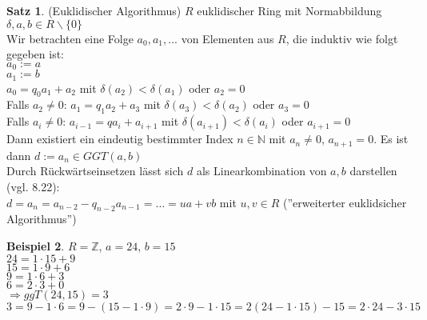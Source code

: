 \documentclass[10pt,a4paper,numbers=endperiod]{scrartcl}
\theoremstyle{definition}
\newtheorem{satz}{Satz}[section]
\newtheorem{bsp}[satz]{Beispiel}
\def\NN{{\mathbb N}}
\def\ZZ{{\mathbb Z}}
\begin{document}
\begin{satz}
	(Euklidischer Algorithmus) $R$ euklidischer Ring mit Normabbildung $\delta, a,b \in R \backslash \{0\}$\\
	Wir betrachten eine Folge $a_0, a_1,...$ von Elementen aus $R$, die induktiv wie folgt gegeben ist:\\
	$a_0 := a$\\
	$a_1 := b$\\
	$a_0 = q_0a_1 + a_2$ mit $\delta(a_2) < \delta(a_1)$ oder $a_2 = 0$\\
	
	Falls $a_2 \neq 0$: $a_1 = q_1a_2 + a_3$ mit $\delta(a_3) < \delta(a_2)$ oder $a_3 = 0$\\
	
	Falls $a_i \neq 0$: $a_{i-1} = qa_i + a_{i+1}$ mit $\delta(a_{i+1}) < \delta(a_i)$ oder $a_{i+1} = 0$\\
	
	Dann existiert ein eindeutig bestimmter Index $n \in \NN$ mit $a_n \neq 0$, $a_{n+1} = 0$. Es ist dann $d := a_n \in GGT(a,b)$\\
	Durch Rückwärtseinsetzen lässt sich $d$ als Linearkombination von $a,b$ darstellen (vgl. 8.22):\\
	$d = a_n = a_{n-2} - q_{n-2} a_{n-1} = \ldots = ua + vb$ mit $u,v \in R$ (''erweiterter euklidsicher Algorithmus'')
\end{satz}

\begin{bsp}
	$R = \ZZ$, $a = 24$, $b = 15$\\
	$24 = 1 \cdot 15 +9$\\
	$15 = 1 \cdot 9 + 6$\\
	$9 = 1 \cdot 6 + 3$\\
	$6 = 2 \cdot 3 + 0$\\
	$\Rightarrow ggT(24, 15) = 3$\\
	$3 = 9 - 1 \cdot 6 = 9 - (15 - 1 \cdot 9) = 2 \cdot 9 - 1 \cdot 15 = 2(24 - 1 \cdot 15) - 15 = 2 \cdot 24 - 3 \cdot 15$
\end{bsp}
\end{document}
